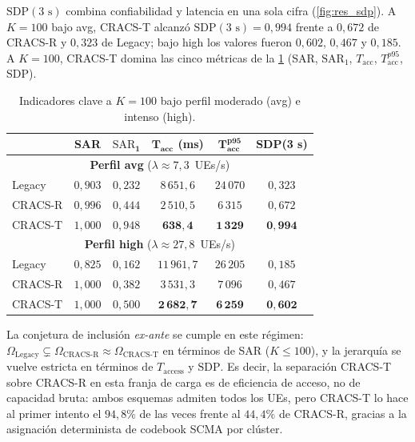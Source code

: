$\mathrm{SDP}(3\text{~s})$ combina confiabilidad y latencia en una sola cifra (\cref{fig:res_sdp}). A $K=100$ bajo avg, CRACS-T alcanzó $\mathrm{SDP}(3\text{~s})=0{,}994$ frente a $0{,}672$ de CRACS-R y $0{,}323$ de Legacy; bajo high los valores fueron $0{,}602$, $0{,}467$ y $0{,}185$. A $K=100$, CRACS-T domina las cinco métricas de la \cref{tab:res_e1_k100} (SAR, $\mathrm{SAR}_1$, $T_{\text{acc}}$, $T_{\text{acc}}^{p95}$, SDP).

\begin{table}[H]
\centering
\caption{Indicadores clave a $K=100$ bajo perfil moderado (avg) e intenso (high).}
\label{tab:res_e1_k100}
\small
\renewcommand{\arraystretch}{1.15}
\begin{tabular}{@{}l c c c c c@{}}
\toprule
& \textbf{SAR} & $\boldsymbol{\mathrm{SAR}_{1}}$ & $\boldsymbol{T_{\text{acc}}}$ \textbf{(ms)} & $\boldsymbol{T_{\text{acc}}^{p95}}$ & \textbf{SDP(3 s)} \\
\midrule
\multicolumn{6}{c}{\textbf{Perfil avg} ($\lambda \approx 7{,}3$~UEs/s)} \\
Legacy  & $0{,}903$ & $0{,}232$ & $8\,651{,}6$ & $24\,070$ & $0{,}323$ \\
CRACS-R & $0{,}996$ & $0{,}444$ & $2\,510{,}5$ & $6\,315$  & $0{,}672$ \\
CRACS-T & $1{,}000$ & $0{,}948$ & $\mathbf{638{,}4}$ & $\mathbf{1\,329}$ & $\mathbf{0{,}994}$ \\
\midrule
\multicolumn{6}{c}{\textbf{Perfil high} ($\lambda \approx 27{,}8$~UEs/s)} \\
Legacy  & $0{,}825$ & $0{,}162$ & $11\,961{,}7$ & $26\,205$ & $0{,}185$ \\
CRACS-R & $1{,}000$ & $0{,}382$ & $3\,531{,}3$  & $7\,096$  & $0{,}467$ \\
CRACS-T & $1{,}000$ & $0{,}500$ & $\mathbf{2\,682{,}7}$ & $\mathbf{6\,259}$ & $\mathbf{0{,}602}$ \\
\bottomrule
\end{tabular}
\end{table}

La conjetura de inclusión \emph{ex-ante} se cumple en este régimen: $\Omega_{\text{Legacy}} \subsetneq \Omega_{\text{CRACS-R}} \approx \Omega_{\text{CRACS-T}}$ en términos de SAR ($K \leq 100$), y la jerarquía se vuelve estricta en términos de $T_{\text{access}}$ y $\mathrm{SDP}$. Es decir, la separación CRACS-T sobre CRACS-R en esta franja de carga es de eficiencia de acceso, no de capacidad bruta: ambos esquemas admiten todos los UEs, pero CRACS-T lo hace al primer intento el $94{,}8\%$ de las veces frente al $44{,}4\%$ de CRACS-R, gracias a la asignación determinista de codebook SCMA por clúster.

